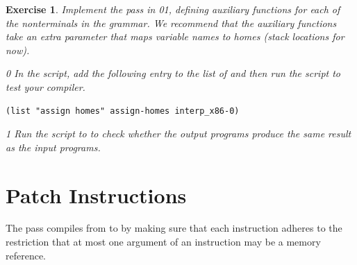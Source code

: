 \documentclass[7x10]{TimesAPriori_MIT}%
\def\racketEd{0}
\def\pythonEd{1}
\def\edition{1}
\newcommand{\racket}[1]{{\if\edition\racketEd{#1}\fi}}
\newcommand{\pythonColor}[0]{}
\newcommand{\python}[1]{{\if\edition\pythonEd\pythonColor #1\fi}}
\newtheorem{exercise}[theorem]{Exercise}
\numberwithin{theorem}{chapter}
\numberwithin{definition}{chapter}
\numberwithin{equation}{chapter}
\begin{document}

\begin{exercise}\normalfont\normalsize
Implement the  pass in
\racket{}\python{}, defining
auxiliary functions for each of the nonterminals in the \LangXVar{}
grammar.  We recommend that the auxiliary functions take an extra
parameter that maps variable names to homes (stack locations for now).
%
{\if\edition\racketEd
In the  script, add the following entry to the
list of  and then run the script to test your compiler.
\begin{lstlisting}
(list "assign homes" assign-homes interp_x86-0)
\end{lstlisting}
\fi}
{\if\edition\pythonEd\pythonColor
Run the  script to to check
whether the output programs produce the same result as the input
programs.
\fi}
\end{exercise}


\section{Patch Instructions}
\label{sec:patch-s0}

The  pass compiles from \LangXVar{} to
\LangXInt{} by making sure that each instruction adheres to the
restriction that at most one argument of an instruction may be a
memory reference. 
\end{document}
